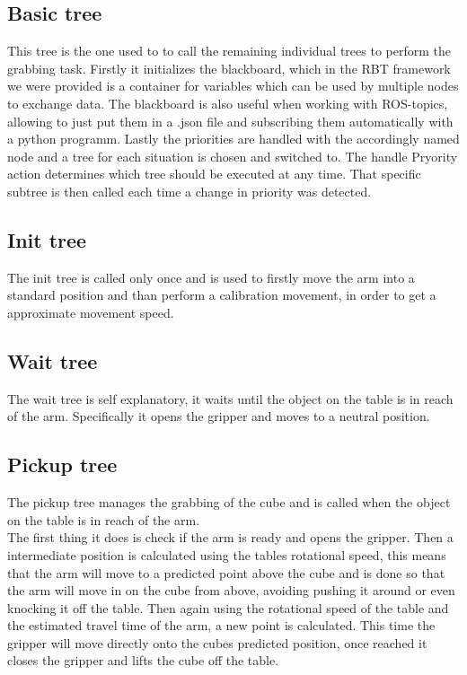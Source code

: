 \documentclass[report]{iisthesis}
\begin{document}
\subsection{Basic tree}
This tree is the one used to to call the remaining individual trees to perform the grabbing task. Firstly it initializes the blackboard, which in the RBT framework we were provided
is a container for variables which can be used by multiple nodes to exchange data. The blackboard is also useful when working with ROS-topics, allowing to just put them in a .json file and subscribing them automatically with a python programm.
Lastly the priorities are handled with the accordingly named node and a tree for each situation is chosen and switched to.
The handle Pryority action determines which tree should be executed at any time. That specific subtree is then called each time a change in priority was detected. 

\subsection{Init tree}
The init tree is called only once and is used to firstly move the arm into a standard position and than perform a calibration movement, in order to get a approximate movement speed. 

\subsection{Wait tree}
The wait tree is self explanatory, it waits until the object on the table is in reach of the arm.
Specifically it opens the gripper and moves to a neutral position.

\subsection{Pickup tree}
The pickup tree manages the grabbing of the cube and is called when the object on the table is in reach of the arm. \\
The first thing it does is check if the arm is ready and opens the gripper. Then a intermediate position is calculated using the tables rotational speed, this means that the arm will move to a predicted point above the cube and is done
so that the arm will move in on the cube from above, avoiding pushing it around or even knocking it off the table. Then again using the rotational speed of the table and the estimated travel time of the arm, a new point is calculated.
This time the gripper will move directly onto the cubes predicted position, once reached it closes the gripper and lifts the cube off the table.
\end{document}
